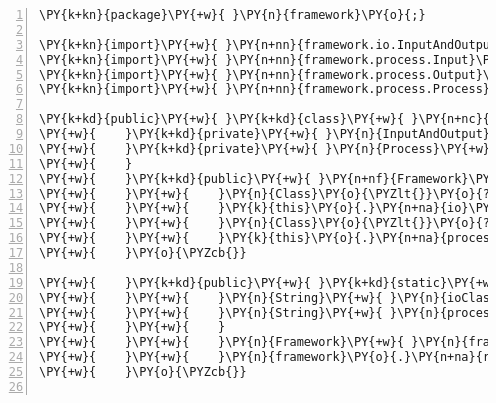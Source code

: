 \begin{Verbatim}[commandchars=\\\{\},numbers=left,firstnumber=1,stepnumber=1,frame=single,fontsize=\small]
\PY{k+kn}{package}\PY{+w}{ }\PY{n}{framework}\PY{o}{;}

\PY{k+kn}{import}\PY{+w}{ }\PY{n+nn}{framework.io.InputAndOutput}\PY{o}{;}
\PY{k+kn}{import}\PY{+w}{ }\PY{n+nn}{framework.process.Input}\PY{o}{;}
\PY{k+kn}{import}\PY{+w}{ }\PY{n+nn}{framework.process.Output}\PY{o}{;}
\PY{k+kn}{import}\PY{+w}{ }\PY{n+nn}{framework.process.Process}\PY{o}{;}

\PY{k+kd}{public}\PY{+w}{ }\PY{k+kd}{class}\PY{+w}{ }\PY{n+nc}{Framework}\PY{+w}{ }\PY{o}{\PYZob{}}
\PY{+w}{    }\PY{k+kd}{private}\PY{+w}{ }\PY{n}{InputAndOutput}\PY{+w}{ }\PY{n}{io}\PY{o}{;}
\PY{+w}{    }\PY{k+kd}{private}\PY{+w}{ }\PY{n}{Process}\PY{+w}{ }\PY{n}{process}\PY{o}{;}
\PY{+w}{    }
\PY{+w}{    }\PY{k+kd}{public}\PY{+w}{ }\PY{n+nf}{Framework}\PY{o}{(}\PY{n}{String}\PY{+w}{ }\PY{n}{ioClass}\PY{o}{,}\PY{+w}{ }\PY{n}{String}\PY{+w}{ }\PY{n}{processClass}\PY{o}{)}\PY{+w}{ }\PY{k+kd}{throws}\PY{+w}{ }\PY{n}{ClassNotFoundException}\PY{o}{,}\PY{+w}{ }\PY{n}{InstantiationException}\PY{o}{,}\PY{+w}{ }\PY{n}{IllegalAccessException}\PY{+w}{ }\PY{o}{\PYZob{}}
\PY{+w}{    }\PY{+w}{    }\PY{n}{Class}\PY{o}{\PYZlt{}}\PY{o}{?}\PY{o}{\PYZgt{}}\PY{+w}{ }\PY{n}{io}\PY{+w}{ }\PY{o}{=}\PY{+w}{ }\PY{n}{Class}\PY{o}{.}\PY{n+na}{forName}\PY{o}{(}\PY{n}{ioClass}\PY{o}{)}\PY{o}{;}
\PY{+w}{    }\PY{+w}{    }\PY{k}{this}\PY{o}{.}\PY{n+na}{io}\PY{+w}{ }\PY{o}{=}\PY{+w}{ }\PY{o}{(}\PY{n}{InputAndOutput}\PY{o}{)}\PY{+w}{ }\PY{n}{io}\PY{o}{.}\PY{n+na}{newInstance}\PY{o}{(}\PY{o}{)}\PY{o}{;}
\PY{+w}{    }\PY{+w}{    }\PY{n}{Class}\PY{o}{\PYZlt{}}\PY{o}{?}\PY{o}{\PYZgt{}}\PY{+w}{ }\PY{n}{process}\PY{+w}{ }\PY{o}{=}\PY{+w}{ }\PY{n}{Class}\PY{o}{.}\PY{n+na}{forName}\PY{o}{(}\PY{n}{processClass}\PY{o}{)}\PY{o}{;}
\PY{+w}{    }\PY{+w}{    }\PY{k}{this}\PY{o}{.}\PY{n+na}{process}\PY{+w}{ }\PY{o}{=}\PY{+w}{ }\PY{o}{(}\PY{n}{Process}\PY{o}{)}\PY{+w}{ }\PY{n}{process}\PY{o}{.}\PY{n+na}{newInstance}\PY{o}{(}\PY{o}{)}\PY{o}{;}
\PY{+w}{    }\PY{o}{\PYZcb{}}

\PY{+w}{    }\PY{k+kd}{public}\PY{+w}{ }\PY{k+kd}{static}\PY{+w}{ }\PY{k+kt}{void}\PY{+w}{ }\PY{n+nf}{main}\PY{o}{(}\PY{n}{String}\PY{o}{[}\PY{o}{]}\PY{+w}{ }\PY{n}{args}\PY{o}{)}\PY{+w}{ }\PY{k+kd}{throws}\PY{+w}{ }\PY{n}{Exception}\PY{+w}{ }\PY{o}{\PYZob{}}
\PY{+w}{    }\PY{+w}{    }\PY{n}{String}\PY{+w}{ }\PY{n}{ioClass}\PY{+w}{ }\PY{o}{=}\PY{+w}{ }\PY{n}{args}\PY{o}{[}\PY{l+m+mi}{0}\PY{o}{]}\PY{o}{;}
\PY{+w}{    }\PY{+w}{    }\PY{n}{String}\PY{+w}{ }\PY{n}{processClass}\PY{+w}{ }\PY{o}{=}\PY{+w}{ }\PY{n}{args}\PY{o}{[}\PY{l+m+mi}{1}\PY{o}{]}\PY{o}{;}
\PY{+w}{    }\PY{+w}{    }
\PY{+w}{    }\PY{+w}{    }\PY{n}{Framework}\PY{+w}{ }\PY{n}{framework}\PY{+w}{ }\PY{o}{=}\PY{+w}{ }\PY{k}{new}\PY{+w}{ }\PY{n}{Framework}\PY{o}{(}\PY{n}{ioClass}\PY{o}{,}\PY{+w}{ }\PY{n}{processClass}\PY{o}{)}\PY{o}{;}
\PY{+w}{    }\PY{+w}{    }\PY{n}{framework}\PY{o}{.}\PY{n+na}{run}\PY{o}{(}\PY{o}{)}\PY{o}{;}
\PY{+w}{    }\PY{o}{\PYZcb{}}


\end{Verbatim}
